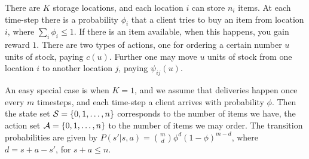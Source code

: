 \begin{example}
  There are $K$ storage locations, and each location $i$ can store
  $n_i$ items.  At each time-step there is a probability $\phi_i$ that
  a client tries to buy an item from location $i$, where $\sum_i
  \phi_i \leq 1$.  If there is an item available, when this happens,
  you gain reward $1$.  There are two types of actions, one for
  ordering a certain number $u$ units of stock, paying $c(u)$.
  Further one may move $u$ units of stock from one location $i$ to
  another location $j$, paying $\psi_{ij}(u)$.
\end{example}

An easy special case is when $K=1$, and we assume that deliveries
happen once every $m$ timesteps, and each time-step a client arrives
with probability $\phi$.  Then the state set ${\mathcal{S}}=\{0, 1, \ldots, n
\}$ corresponds to the number of items we have, the action set
${\mathcal{A}}=\{0, 1, \ldots, n\}$ to the number of items we may order.  The
transition probabilities are given by $P(s'|s,a) =
\binom{m}{d}\phi^d(1-\phi)^{m-d}$, where $d=s+a-s'$, for $s+a \leq n$.


\newcommand{\Node}[3]{%
  \pgfnodecircle{#1}[stroke]{#2}{0.3cm}%
  \pgfputat{\pgfrelative{#2}{\pgfxy(0,-.075)}}{\pgfbox[center,base]{#3}}}

\newcommand{\SNode}[3]{%
  \pgfnodebox{#1}[stroke]{#2}{0.3cm}%
  \pgfputat{\pgfrelative{#2}{\pgfxy(0,-.075)}}{\pgfbox[center,base]{#3}}}

\newcommand{\BNode}[3]{%
  \pgfnodecircle{#1}[stroke]{#2}{0.4cm}%
  \pgfputat{\pgfrelative{#2}{\pgfxy(0,-.075)}}{\pgfbox[center,base]{#3}}}

\newcommand{\Claim}[2]{%
  \pgfputat{\pgfrelative{\pgfxy(0.4,-0.075)}{\pgfnodecenter{#1}}}%
  {\pgfbox[left,base]{#2}}}

\newcommand{\LClaim}[2]{%
  \pgfputat{\pgfrelative{\pgfxy(-0.4,-0.075)}{\pgfnodecenter{#1}}}%
  {\pgfbox[right,base]{#2}}}

\newcommand{\Bush}[3]{%
  \pgfnodecircle{#1}[virtual]{\pgfrelative{\pgfnodecenter{#2}}{#3}}{1pt}%
  \pgfnodeconnline{#2}{#1}}


